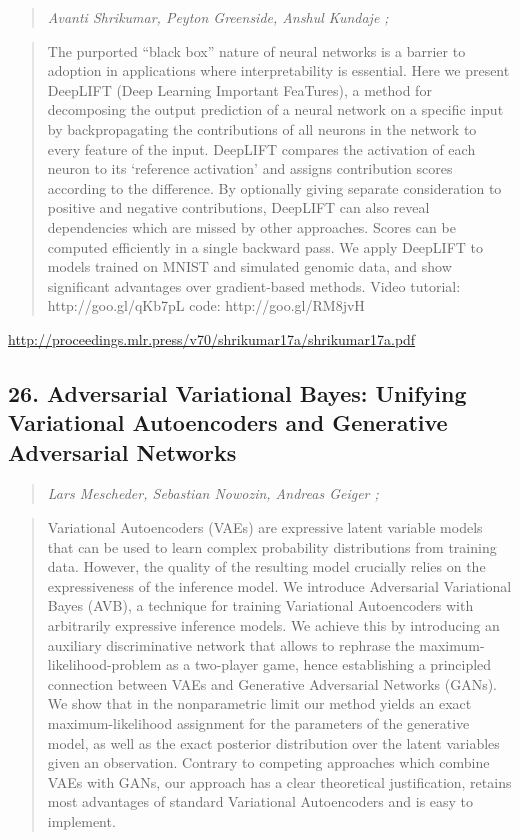 \documentclass{article}
\begin{document}
\begin{quote}
\footnotesize{\textit{Avanti Shrikumar, Peyton Greenside, Anshul Kundaje ;}}

\end{quote}

\begin{quote}
    The purported “black box” nature of neural networks is a barrier to adoption in applications where interpretability is essential. Here we present DeepLIFT (Deep Learning Important FeaTures), a method for decomposing the output prediction of a neural network on a specific input by backpropagating the contributions of all neurons in the network to every feature of the input. DeepLIFT compares the activation of each neuron to its `reference activation’ and assigns contribution scores according to the difference. By optionally giving separate consideration to positive and negative contributions, DeepLIFT can also reveal dependencies which are missed by other approaches. Scores can be computed efficiently in a single backward pass. We apply DeepLIFT to models trained on MNIST and simulated genomic data, and show significant advantages over gradient-based methods. Video tutorial: http://goo.gl/qKb7pL code: http://goo.gl/RM8jvH  
\end{quote}

\href{http://proceedings.mlr.press/v70/shrikumar17a/shrikumar17a.pdf}{http://proceedings.mlr.press/v70/shrikumar17a/shrikumar17a.pdf}

\subsection{26. Adversarial Variational Bayes: Unifying Variational Autoencoders and Generative Adversarial Networks}

\begin{quote}
\footnotesize{\textit{Lars Mescheder, Sebastian Nowozin, Andreas Geiger ;}}

\end{quote}

\begin{quote}
    Variational Autoencoders (VAEs) are expressive latent variable models that can be used to learn complex probability distributions from training data. However, the quality of the resulting model crucially relies on the expressiveness of the inference model. We introduce Adversarial Variational Bayes (AVB), a technique for training Variational Autoencoders with arbitrarily expressive inference models. We achieve this by introducing an auxiliary discriminative network that allows to rephrase the maximum-likelihood-problem as a two-player game, hence establishing a principled connection between VAEs and Generative Adversarial Networks (GANs). We show that in the nonparametric limit our method yields an exact maximum-likelihood assignment for the parameters of the generative model, as well as the exact posterior distribution over the latent variables given an observation. Contrary to competing approaches which combine VAEs with GANs, our approach has a clear theoretical justification, retains most advantages of standard Variational Autoencoders and is easy to implement.  
\end{quote}
\end{document}

